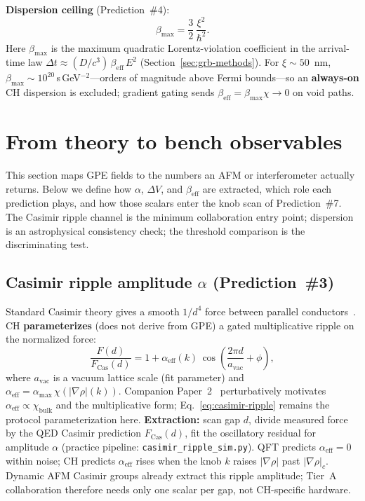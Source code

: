 \documentclass[11pt,a4paper]{article}
\begin{document}
\textbf{Dispersion ceiling} (Prediction~\#4):
\begin{equation}
  \beta_{\max} = \frac{3}{2}\,\frac{\xi^2}{\hbar^2}.
  \label{eq:beta-max}
\end{equation}
Here $\beta_{\max}$ is the maximum quadratic Lorentz-violation coefficient in the arrival-time law $\Delta t \approx (D/c^3)\,\beta_{\mathrm{eff}}\,E^2$ (Section~\ref{sec:grb-methods}).
For $\xi \sim 50$~nm, $\beta_{\max} \sim 10^{20}$\,s\,GeV$^{-2}$---orders of magnitude above Fermi bounds---so an \textbf{always-on} CH dispersion is excluded; gradient gating sends $\beta_{\mathrm{eff}} = \beta_{\max}\chi \to 0$ on void paths.

\section{From theory to bench observables}
\label{sec:observables}

This section maps GPE fields to the numbers an AFM or interferometer actually returns.
Below we define how $\alpha$, $\Delta V$, and $\beta_{\mathrm{eff}}$ are extracted, which role each prediction plays, and how those scalars enter the knob scan of Prediction~\#7.
The Casimir ripple channel is the minimum collaboration entry point; dispersion is an astrophysical consistency check; the threshold comparison is the discriminating test.

\subsection{Casimir ripple amplitude $\alpha$ (Prediction~\#3)}

Standard Casimir theory gives a smooth $1/d^4$ force between parallel conductors~\cite{Casimir1948}.
CH \textbf{parameterizes} (does not derive from GPE) a gated multiplicative ripple on the normalized force:
\begin{equation}
  \frac{F(d)}{F_{\mathrm{Cas}}(d)} = 1 + \alpha_{\mathrm{eff}}(k)\,
  \cos\!\left(\frac{2\pi d}{a_{\mathrm{vac}}} + \phi\right),
  \label{eq:casimir-ripple}
\end{equation}
where $a_{\mathrm{vac}}$ is a vacuum lattice scale (fit parameter) and $\alpha_{\mathrm{eff}} = \alpha_{\max}\,\chi(|\nabla\rho|(k))$.
Companion Paper~2~\cite{CHPaper2} perturbatively motivates $\alpha_{\mathrm{eff}} \propto \chi_{\mathrm{bulk}}$ and the multiplicative form; Eq.~\ref{eq:casimir-ripple} remains the protocol parameterization here.
\textbf{Extraction:} scan gap $d$, divide measured force by the QED Casimir prediction $F_{\mathrm{Cas}}(d)$, fit the oscillatory residual for amplitude $\alpha$ (practice pipeline: \texttt{casimir\_ripple\_sim.py}).
QFT predicts $\alpha_{\mathrm{eff}} = 0$ within noise; CH predicts $\alpha_{\mathrm{eff}}$ rises when the knob $k$ raises $|\nabla\rho|$ past $|\nabla\rho|_c$.
Dynamic AFM Casimir groups already extract this ripple amplitude; Tier~A collaboration therefore needs only one scalar per gap, not CH-specific hardware.
\end{document}
